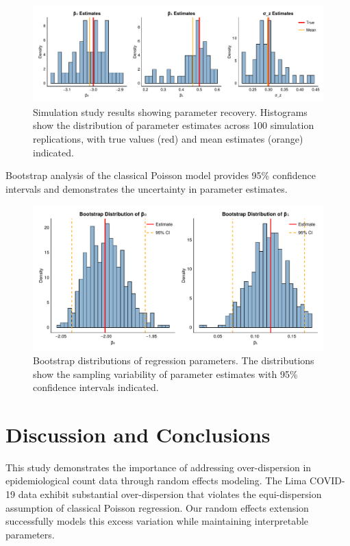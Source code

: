 \documentclass[11pt]{article}
\begin{document}
\begin{figure}[H]
\centering
\includegraphics[width=\textwidth]{figures/figure4_simulation_results.pdf}
\caption{Simulation study results showing parameter recovery. Histograms show the distribution of parameter estimates across 100 simulation replications, with true values (red) and mean estimates (orange) indicated.}
\label{fig:simulation}
\end{figure}

Bootstrap analysis of the classical Poisson model provides 95\% confidence intervals and demonstrates the uncertainty in parameter estimates.

\begin{figure}[H]
\centering
\includegraphics[width=\textwidth]{figures/figure3_bootstrap_distributions.pdf}
\caption{Bootstrap distributions of regression parameters. The distributions show the sampling variability of parameter estimates with 95\% confidence intervals indicated.}
\label{fig:bootstrap}
\end{figure}

\section{Discussion and Conclusions}

This study demonstrates the importance of addressing over-dispersion in epidemiological count data through random effects modeling. The Lima COVID-19 data exhibit substantial over-dispersion that violates the equi-dispersion assumption of classical Poisson regression. Our random effects extension successfully models this excess variation while maintaining interpretable parameters.
\end{document}
